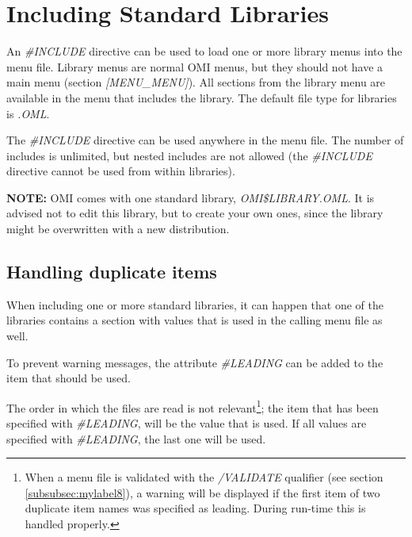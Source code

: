 \documentclass[a4paper]{book}
\newcommand{\vs}{\vspace{3mm}}
\begin{document}
\section{Including Standard Libraries}
\label{subsec:including}

An \textsl{{\#}INCLUDE} directive can be used to load one or more 
library menus into the menu file. Library menus are normal OMI menus, but 
they should not have a main menu (section \textsl{[MENU{\_}MENU]}). All sections from 
the library menu are available in the menu that includes the library. The 
default file type for libraries is \textsl{.OML}.

\vs

The \textsl{{\#}INCLUDE} directive can be used anywhere in the menu file. The number 
of includes is unlimited, but nested includes are not allowed (the 
\textsl{{\#}INCLUDE} directive cannot be used from within libraries).

\vs

\hspace{-8mm}\textbf{NOTE:} OMI comes with one standard library, 
\textsl{OMI{\$}LIBRARY.OML}. It is advised not to edit this library, but to 
create your own ones, since the library might be overwritten with a new 
distribution.

\subsection{Handling duplicate items}
\label{subsubsec:handling}

When including one or more standard libraries, it can happen that one of the 
libraries contains a section with values that is used in the calling menu 
file as well.

To prevent warning messages, the attribute \textsl{{\#}LEADING} can be added 
to the item that should be used.

\vs

The order in which the files are read is not relevant\footnote{ When a menu 
file is validated with the \textsl{/VALIDATE} qualifier (see section 
\ref{subsubsec:mylabel8}), a warning will be displayed if the first 
item of two duplicate item names was specified as leading. During run-time 
this is handled properly.}; the item that has been specified with 
\textsl{{\#}LEADING}, will be the value that is used. If all values are specified 
with \textsl{{\#}LEADING}, the last one will be used.
\end{document}
